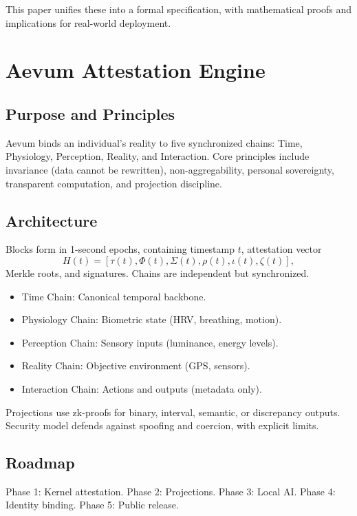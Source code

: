 \documentclass[11pt,a4paper]{article}
\theoremstyle{plain}
\begin{document}
This paper unifies these into a formal specification, with mathematical proofs and implications for real-world deployment.

\section{Aevum Attestation Engine}

\subsection{Purpose and Principles}

Aevum binds an individual's reality to five synchronized chains: Time, Physiology, Perception, Reality, and Interaction. Core principles include invariance (data cannot be rewritten), non-aggregability, personal sovereignty, transparent computation, and projection discipline.

\subsection{Architecture}

Blocks form in 1-second epochs, containing timestamp $t$, attestation vector
\[
H(t) = [\tau(t), \Phi(t), \Sigma(t), \rho(t), \iota(t), \zeta(t)],
\]
Merkle roots, and signatures. Chains are independent but synchronized.

\begin{itemize}
    \item Time Chain: Canonical temporal backbone.
    \item Physiology Chain: Biometric state (HRV, breathing, motion).
    \item Perception Chain: Sensory inputs (luminance, energy levels).
    \item Reality Chain: Objective environment (GPS, sensors).
    \item Interaction Chain: Actions and outputs (metadata only).
\end{itemize}

Projections use zk-proofs for binary, interval, semantic, or discrepancy outputs. Security model defends against spoofing and coercion, with explicit limits.

\subsection{Roadmap}

Phase 1: Kernel attestation. Phase 2: Projections. Phase 3: Local AI. Phase 4: Identity binding. Phase 5: Public release.
\end{document}
